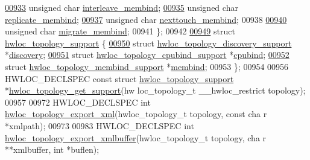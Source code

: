 \begin{DoxyCode}
\hypertarget{a00033_source_l00933}{}\hyperlink{a00025_a3c44c6012860bbeba8a0f4c19710858d}{00933}   \textcolor{keywordtype}{unsigned} \textcolor{keywordtype}{char} \hyperlink{a00025_a3c44c6012860bbeba8a0f4c19710858d}{interleave_membind};
\hypertarget{a00033_source_l00935}{}\hyperlink{a00025_afe608fb85eb2aa9706221ccb5fc4d415}{00935}   \textcolor{keywordtype}{unsigned} \textcolor{keywordtype}{char} \hyperlink{a00025_afe608fb85eb2aa9706221ccb5fc4d415}{replicate_membind};
\hypertarget{a00033_source_l00937}{}\hyperlink{a00025_ab0921af6e0cd6975812a80b8e5c7435c}{00937}   \textcolor{keywordtype}{unsigned} \textcolor{keywordtype}{char} \hyperlink{a00025_ab0921af6e0cd6975812a80b8e5c7435c}{nexttouch_membind};
00938 
\hypertarget{a00033_source_l00940}{}\hyperlink{a00025_aafa7683871a6a760246f9b35209caec5}{00940}   \textcolor{keywordtype}{unsigned} \textcolor{keywordtype}{char} \hyperlink{a00025_aafa7683871a6a760246f9b35209caec5}{migrate_membind};
00941 \};
00942 
\hypertarget{a00033_source_l00949}{}\hyperlink{a00026}{00949} \textcolor{keyword}{struct }\hyperlink{a00026}{hwloc_topology_support} \{
\hypertarget{a00033_source_l00950}{}\hyperlink{a00026_aea3fbd7653d987d81f848636c420504d}{00950}   \textcolor{keyword}{struct }\hyperlink{a00024}{hwloc_topology_discovery_support} *\hyperlink{a00026_aea3fbd7653d987d81f848636c420504d}{discovery};
\hypertarget{a00033_source_l00951}{}\hyperlink{a00026_adef2bb91f74c3e70a2a071393caf5f56}{00951}   \textcolor{keyword}{struct }\hyperlink{a00023}{hwloc_topology_cpubind_support} *\hyperlink{a00026_adef2bb91f74c3e70a2a071393caf5f56}{cpubind};
\hypertarget{a00033_source_l00952}{}\hyperlink{a00026_ac6eb62ae8bc0a68dce679a7107a36194}{00952}   \textcolor{keyword}{struct }\hyperlink{a00025}{hwloc_topology_membind_support} *\hyperlink{a00026_ac6eb62ae8bc0a68dce679a7107a36194}{membind};
00953 \};
00954 
00956 HWLOC\_DECLSPEC \textcolor{keyword}{const} \textcolor{keyword}{struct }\hyperlink{a00026}{hwloc_topology_support} *\hyperlink{a00044_gac2126e105f3ae708efca2e90d612625a}{hwloc_topology_get_support}(hw
      loc\_topology\_t \_\_hwloc\_restrict topology);
00957 
00972 HWLOC\_DECLSPEC \textcolor{keywordtype}{int} \hyperlink{a00045_ga45578d725c66865cfef31d0585dcff70}{hwloc_topology_export_xml}(hwloc\_topology\_t topology, \textcolor{keyword}{const} \textcolor{keywordtype}{cha
      r} *xmlpath);
00973 
00983 HWLOC\_DECLSPEC \textcolor{keywordtype}{int} \hyperlink{a00045_ga739330e9402425315e44e5012631fb91}{hwloc_topology_export_xmlbuffer}(hwloc\_topology\_t topology, \textcolor{keywordtype}{cha
      r} **xmlbuffer, \textcolor{keywordtype}{int} *buflen);

\end{DoxyCode}
